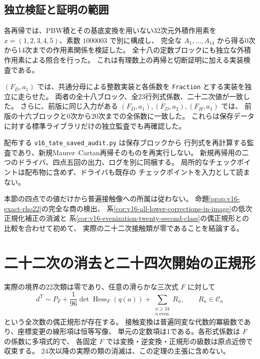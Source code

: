 \subsection{独立検証と証明の範囲}

各再帰では、PBW積とその基底変換を用いない32次元外積作用素を
$x=(1,2,3,4,5)$、素数 $1000003$ で別に構成し、
完全な $A_1,\ldots,A_{14}$ から得る0次から14次までの作用素関係を検証した。
全十八の定数ブロックにも独立な外積作用素による照合を行った。
これは有理数上の再帰と切断証明に加える実装検査である。

$(F_D,a_1)$ では、共通分母による整数実装と各係数を
\texttt{Fraction} とする実装を独立に走らせた。
両者の全十八ブロック、全23行列式係数、二十二次値が一致した。
さらに、前版に同じ入力がある $(F_D,a_1),(F_D,a_2),(F_H,a_1)$ では、
前版の十六ブロックと0次から20次までの全係数に一致した。
これらは保存データに対する標準ライブラリだけの独立監査でも再確認した。

配布する \texttt{v16\_tate\_saved\_audit.py} は保存ブロックから
行列式を再計算する監査であり、新規Maurer--Cartan再帰そのものを再実行しない。
新規再帰用の二つのドライバ、四点五回の出力、ログを別に同梱する。
局所的なチェックポイントは配布物に含めず、ドライバも既存の
チェックポイントを入力として読まない。

本節の四点での値だけから普遍接触像への所属は従わない。
命題\ref{prop:v16-exact-rho22}の完全な商の検出、
系\ref{cor:v16-all-lower-corrections-in-image}の低次正規化補正の消滅と
系\ref{cor:v16-evenization-twenty-second-class}の偶正規形との比較を合わせて初めて、
実際の二十二次接触類が零であることを結論する。




\section{二十二次の消去と二十四次開始の正規形}
\label{sec:v16-twenty-fourth-normal-form}

\begin{theorem}[二十四次開始の普遍代数的収束偶正規形]
\label{thm:v16-twenty-fourth-normal-form}
実際の境界の22次類は零であり、任意の滑らかな三次式 $F$ に対して
\begin{equation}\label{eq:v16-twenty-fourth-normal-form}
 \boxed{\displaystyle
 d^{\mathrm T}\sim
 P_F+\frac1{96}\det\operatorname{Hess}_F(q(a))
       +\sum_{\substack{n\ge24\\n\ \mathrm{even}}}R_n,
 \qquad R_n\in\mathcal C_n}
\end{equation}
という全次数の偶正規形が存在する。
接触変換は普遍同変な代数的冪級数であり、座標変更の線形項は恒等写像、
単元の定数項は1である。各形式係数は $F$ の係数に多項式的で、
各固定 $F$ では変換・逆変換・正規形の級数は原点近傍で収束する。
24次以降の実際の類の消滅は、この定理の主張に含めない。
\end{theorem}


